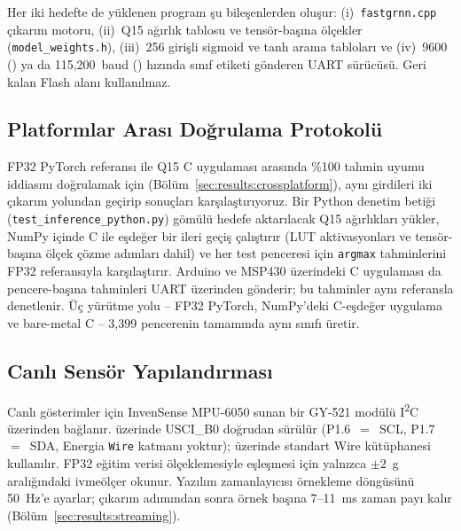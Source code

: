 Her iki hedefte de yüklenen program şu bileşenlerden oluşur:
(i)~\texttt{fastgrnn.cpp} çıkarım motoru,
(ii)~Q15 ağırlık tablosu ve tensör-başına ölçekler
(\texttt{model\_weights.h}),
(iii)~256 girişli sigmoid ve tanh arama tabloları ve
(iv)~9600 (\msp{}) ya da 115{,}200~baud (\arduino{}) hızında sınıf
etiketi gönderen UART sürücüsü. Geri kalan Flash alanı kullanılmaz.

\subsection{Platformlar Arası Doğrulama Protokolü}
\label{sec:setup:verify}

FP32 PyTorch referansı ile Q15 C uygulaması arasında \%100 tahmin
uyumu iddiasını doğrulamak için (Bölüm~\ref{sec:results:crossplatform}),
aynı girdileri iki çıkarım yolundan geçirip sonuçları
karşılaştırıyoruz. Bir Python denetim betiği
(\texttt{test\_inference\_python.py}) gömülü hedefe aktarılacak Q15
ağırlıkları yükler, NumPy içinde C ile eşdeğer bir ileri geçiş
çalıştırır (LUT aktivasyonları ve tensör-başına ölçek çözme adımları
dahil) ve her test penceresi için \texttt{argmax} tahminlerini FP32
referansıyla karşılaştırır. Arduino ve MSP430 üzerindeki C uygulaması
da pencere-başına tahminleri UART üzerinden gönderir; bu tahminler
aynı referansla denetlenir. Üç yürütme yolu -- FP32 PyTorch,
NumPy'deki C-eşdeğer uygulama ve bare-metal C -- 3{,}399 pencerenin
tamamında aynı sınıfı üretir.

\subsection{Canlı Sensör Yapılandırması}

Canlı gösterimler için InvenSense MPU-6050 sunan bir GY-521 modülü
I\textsuperscript{2}C üzerinden bağlanır. \msp{} üzerinde USCI\_B0
doğrudan sürülür (P1.6~$=$~SCL, P1.7~$=$~SDA, Energia
\texttt{Wire} katmanı yoktur); \arduino{} üzerinde standart Wire
kütüphanesi kullanılır. FP32 eğitim verisi ölçeklemesiyle eşleşmesi
için yalnızca $\pm 2$~g aralığındaki ivmeölçer okunur. Yazılım
zamanlayıcısı örnekleme döngüsünü 50~Hz'e ayarlar; çıkarım
adımından sonra örnek başına 7--11~ms zaman payı kalır
(Bölüm~\ref{sec:results:streaming}).
